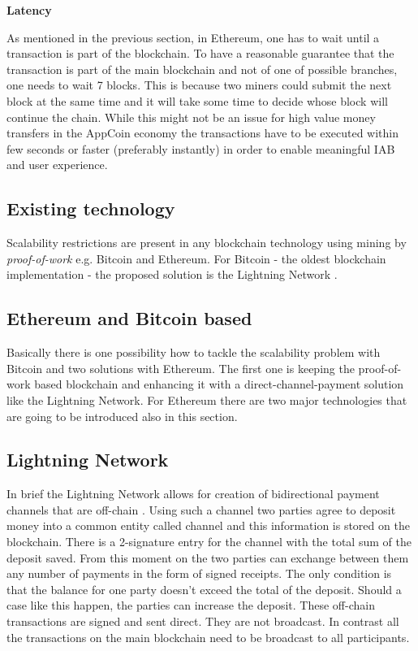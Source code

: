 \medskip

{\bf Latency}

As mentioned in the previous section, in Ethereum, one has to wait until a transaction is part of the blockchain. To have a reasonable guarantee that the transaction is part of the main blockchain and not of one of possible branches, one needs to wait 7 blocks. This is because two miners could submit the next block at the same time and it will take some time to decide whose block will continue the chain. While this might not be an issue for high value money transfers in the AppCoin economy the transactions have to be executed within few seconds or faster (preferably instantly) in order to enable meaningful IAB and user experience.

\subsection{Existing technology}

Scalability restrictions are present in any blockchain technology using mining by \textit{proof-of-work} e.g. Bitcoin and Ethereum. For Bitcoin - the oldest blockchain implementation - the proposed solution is the Lightning Network \cite{LighthingNetwork}.


\subsection{Ethereum and Bitcoin based}

Basically there is one possibility how to tackle the scalability problem with Bitcoin and two solutions with Ethereum. The first one is keeping the proof-of-work based blockchain and enhancing it with a direct-channel-payment solution like the Lightning Network. For Ethereum there are two major technologies that are going to be introduced also in this section.

\subsection{Lightning Network}
In brief the Lightning Network allows for creation of bidirectional payment channels that are off-chain \cite{LighthingNetwork}. Using such a channel two parties agree to deposit money into a common entity called channel and this information is stored on the blockchain. There is a 2-signature entry for the channel with the total sum of the deposit saved. From this moment on the two parties can exchange between them any number of payments in the form of signed receipts. The only condition is that the balance for one party doesn't exceed the total of the deposit. Should a case like this happen, the parties can increase the deposit. These off-chain transactions are signed and sent direct. They are not broadcast. In contrast all the transactions on the main blockchain need to be broadcast to all participants. 

